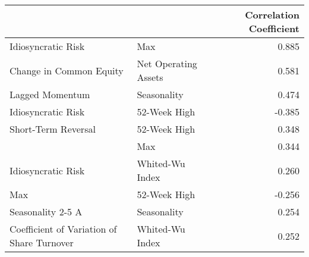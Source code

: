 \begin{tabular}{llr}
\toprule
                                           &                 &  Correlation Coefficient \\
\midrule
Idiosyncratic Risk & Max &                    0.885 \\
Change in Common Equity & Net Operating Assets &                    0.581 \\
Lagged Momentum & Seasonality &                    0.474 \\
Idiosyncratic Risk & 52-Week High &                   -0.385 \\
Short-Term Reversal & 52-Week High &                    0.348 \\
                                           & Max &                    0.344 \\
Idiosyncratic Risk & Whited-Wu Index &                    0.260 \\
Max & 52-Week High &                   -0.256 \\
Seasonality 2-5 A & Seasonality &                    0.254 \\
Coefficient of Variation of Share Turnover & Whited-Wu Index &                    0.252 \\
\bottomrule
\end{tabular}
